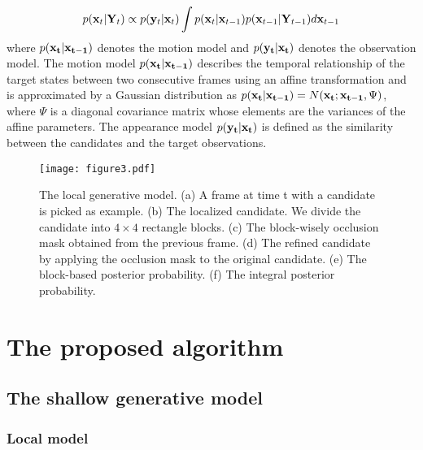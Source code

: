 \documentclass[preprint,12pt,review]{elsarticle}
\begin{document}
\begin{equation}
p({{\bf{x}}_t}|{{\bf{Y}}_t}) \propto p({{\bf{y}}_t}|{{\bf{x}}_t})\int {p({{\bf{x}}_t}} |{{\bf{x}}_{t - 1}})p({{\bf{x}}_{t - 1}}|{{\bf{Y}}_{t - 1}})d{{\bf{x}}_{t - 1}}
\end{equation}
where ${p({\bf{x}_t}} |{\bf{x}_{t - 1}})$ denotes the motion model and $p({\bf{y}_t}|{\bf{x}_t})$ denotes the observation model.
The motion model ${p({\bf{x}_t}} |{\bf{x}_{t - 1}})$ describes the temporal relationship of the target states between two consecutive frames using an affine transformation and is approximated by a Gaussian distribution as $p({\bf{x}_t}|{\bf{x}_{t - 1}}) = N({\bf{x}_t};{\bf{x}_{t - 1}},\Psi )$, where $\Psi$ is a diagonal covariance matrix whose elements are the variances of the affine parameters.
The appearance model $p({\bf{y}_t}|{\bf{x}_t})$ is defined as the similarity between the candidates and the target observations.

\begin{figure*}[tbp]
\centering
\texttt{[image: figure3.pdf]}
\vspace{-8mm}
\caption{The local generative model. (a) A frame at time t with a candidate is picked as example. (b) The localized candidate. We divide the candidate into $4 \times 4$ rectangle blocks. (c) The block-wisely occlusion mask obtained from the previous frame. (d) The refined candidate by applying the occlusion mask to the original candidate. (e) The block-based posterior probability. (f) The integral posterior probability.}

\label{fig:generativemodel}
\end{figure*}

\section{The proposed algorithm}
\subsection{The shallow generative model}
\subsubsection{Local model}
\end{document}
